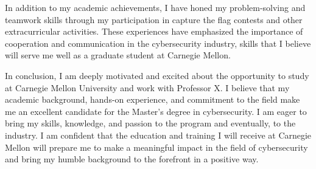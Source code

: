 \documentclass{letter}
\begin{document}
In addition to my academic achievements, I have honed my problem-solving and teamwork skills through my participation in capture the flag contests and other extracurricular activities. These experiences have emphasized the importance of cooperation and communication in the cybersecurity industry, skills that I believe will serve me well as a graduate student at Carnegie Mellon.

In conclusion, I am deeply motivated and excited about the opportunity to study at Carnegie Mellon University and work with Professor X. I believe that my academic background, hands-on experience, and commitment to the field make me an excellent candidate for the Master's degree in cybersecurity. I am eager to bring my skills, knowledge, and passion to the program and eventually, to the industry. I am confident that the education and training I will receive at Carnegie Mellon will prepare me to make a meaningful impact in the field of cybersecurity and bring my humble background to the forefront in a positive way.
\end{document}
